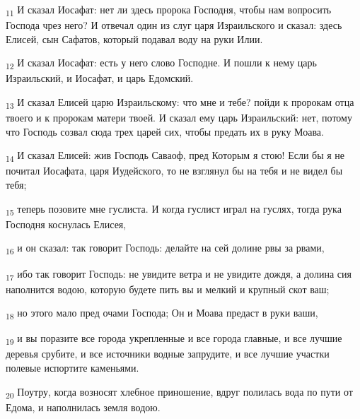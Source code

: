 \begin{tcolorbox}
\textsubscript{11} И сказал Иосафат: нет ли здесь пророка Господня, чтобы нам вопросить Господа чрез него? И отвечал один из слуг царя Израильского и сказал: здесь Елисей, сын Сафатов, который подавал воду на руки Илии.
\end{tcolorbox}
\begin{tcolorbox}
\textsubscript{12} И сказал Иосафат: есть у него слово Господне. И пошли к нему царь Израильский, и Иосафат, и царь Едомский.
\end{tcolorbox}
\begin{tcolorbox}
\textsubscript{13} И сказал Елисей царю Израильскому: что мне и тебе? пойди к пророкам отца твоего и к пророкам матери твоей. И сказал ему царь Израильский: нет, потому что Господь созвал сюда трех царей сих, чтобы предать их в руку Моава.
\end{tcolorbox}
\begin{tcolorbox}
\textsubscript{14} И сказал Елисей: жив Господь Саваоф, пред Которым я стою! Если бы я не почитал Иосафата, царя Иудейского, то не взглянул бы на тебя и не видел бы тебя;
\end{tcolorbox}
\begin{tcolorbox}
\textsubscript{15} теперь позовите мне гуслиста. И когда гуслист играл на гуслях, тогда рука Господня коснулась Елисея,
\end{tcolorbox}
\begin{tcolorbox}
\textsubscript{16} и он сказал: так говорит Господь: делайте на сей долине рвы за рвами,
\end{tcolorbox}
\begin{tcolorbox}
\textsubscript{17} ибо так говорит Господь: не увидите ветра и не увидите дождя, а долина сия наполнится водою, которую будете пить вы и мелкий и крупный скот ваш;
\end{tcolorbox}
\begin{tcolorbox}
\textsubscript{18} но этого мало пред очами Господа; Он и Моава предаст в руки ваши,
\end{tcolorbox}
\begin{tcolorbox}
\textsubscript{19} и вы поразите все города укрепленные и все города главные, и все лучшие деревья срубите, и все источники водные запрудите, и все лучшие участки полевые испортите каменьями.
\end{tcolorbox}
\begin{tcolorbox}
\textsubscript{20} Поутру, когда возносят хлебное приношение, вдруг полилась вода по пути от Едома, и наполнилась земля водою.
\end{tcolorbox}
